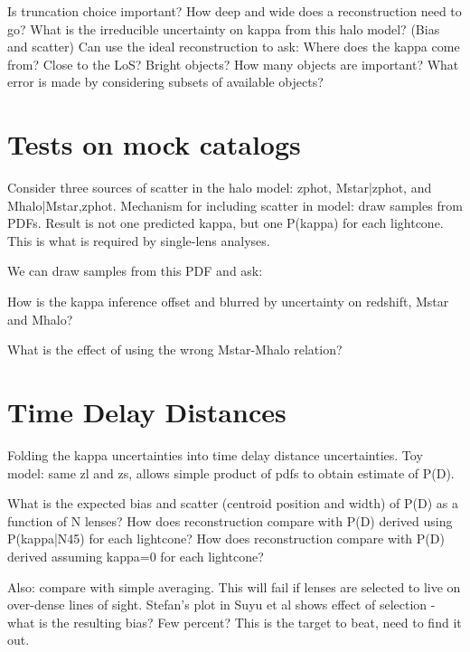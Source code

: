 \documentclass[useAMS,usenatbib]{mn2e}
\begin{document}
Is truncation choice important? How deep and wide does a reconstruction need to
go? What is the irreducible uncertainty on kappa from this halo model? (Bias and
scatter) Can use the ideal reconstruction to ask: Where does the kappa come
from? Close to the LoS? Bright objects? How many objects are important? What
error is made by considering subsets of available objects? 



\section{Tests on mock catalogs}
\label{sec:obsMstar+z}

Consider three sources of scatter in the halo model: zphot, Mstar|zphot, and
Mhalo|Mstar,zphot. Mechanism for including scatter in model: draw samples from
PDFs. Result is not one predicted kappa, but one P(kappa) for each lightcone.
This is what is required by single-lens analyses. 

We can draw samples from this PDF and ask:

How is the kappa inference offset and blurred by uncertainty on redshift, Mstar
and Mhalo? 

What is the effect of using the wrong Mstar-Mhalo relation? 



\section{Time Delay Distances}
\label{sec:} 

Folding the kappa uncertainties into time delay distance uncertainties. Toy
model: same zl and zs, allows simple product of pdfs to obtain estimate of P(D).

What is the expected bias and scatter (centroid position and width) of P(D) as a
function of N lenses? How does reconstruction compare with P(D) derived using
P(kappa|N45) for each lightcone? How does reconstruction compare with P(D)
derived assuming kappa=0 for each lightcone?

Also: compare with simple averaging. This will fail if lenses are selected to
live on over-dense lines of sight. Stefan's plot in Suyu et al shows effect of
selection - what is the resulting bias? Few percent? This is the target to beat,
need to find it out.
\end{document}
